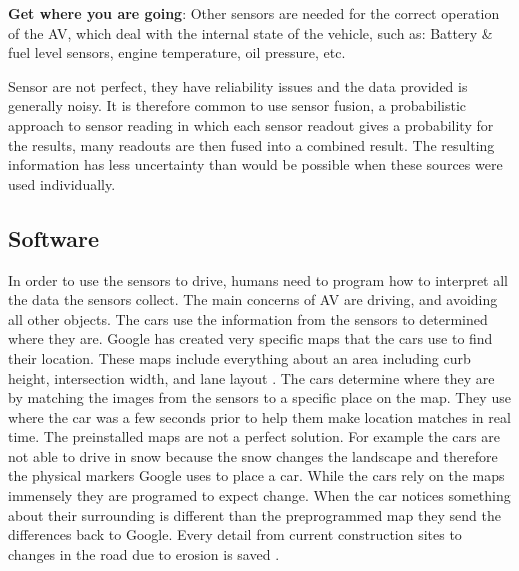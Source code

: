 \documentclass[11pt]{article}
\begin{document}
\textbf{Get where you are going}:
		Other sensors are needed for the correct operation of the AV, which deal with the internal state of the vehicle, such as: Battery \& fuel level sensors, engine temperature, oil pressure, etc.

Sensor are not perfect, they have reliability issues and the data provided is generally noisy. It is therefore common to use sensor fusion, a probabilistic approach to sensor reading in which each sensor readout gives a probability for the results, many readouts are then fused into a combined result. The resulting information has less uncertainty than would be possible when these sources were used individually.\cite{HellstromUmea}

\subsection{Software}
In order to use the sensors to drive, humans need to program how to interpret all the data the sensors collect. The main concerns of AV are driving, and avoiding all other objects. The cars use the information from the sensors to determined where they are. Google has created very specific maps that the cars use to find their location. These maps include everything about an area including curb height, intersection width, and lane layout \cite{chrisurmson2016}.
The cars determine where they are by matching the images from the sensors to
a specific place on the map. They use where the car was a few seconds prior to help them make location matches in real
time. The preinstalled maps are not a perfect solution. For example the
cars are not able to drive in snow because the snow changes the landscape and therefore the physical markers Google
uses to place a car\cite{chrisurmson2016}. While the cars rely on the maps immensely they are programed to expect change. When the car notices something about their surrounding is
different than the preprogrammed map they send the differences back to Google. Every detail from current construction sites to changes in the road due to erosion
is saved \cite{chrisurmson2016}.
\end{document}
